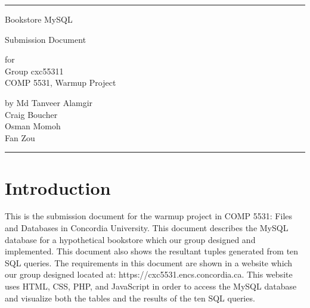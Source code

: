 \documentclass{scrreprt}
\date{}
\begin{document}
\begin{titlepage}
  \flushright\bfseries\huge
    \rule{\linewidth}{5pt}
    \par
    \vspace{1cm}
    {\Huge Bookstore MySQL \par Submission Document\par}
    \vspace{2cm}
    for \\
    \vspace{2cm}
    Group cxc55311 \\
    COMP 5531, Warmup Project \\
    \vspace{2cm}

    by Md Tanveer Alamgir \\
     Craig Boucher\\
     Osman Momoh\\
     Fan Zou\\
    \vspace{2cm}
    \rule{\linewidth}{5pt}
\end{titlepage}
\tableofcontents
\chapter{Introduction}
This is the submission document for the warmup project in COMP 5531: Files and Databases in Concordia University. This document describes the MySQL database for a hypothetical bookstore which our group designed and implemented. This document also shows the resultant tuples generated from ten SQL queries. The requirements in this document are shown in a website which our group designed located at: https://cxc5531.encs.concordia.ca. This website uses HTML, CSS, PHP, and JavaScript in order to access the MySQL database and visualize both the tables and the results of the ten SQL queries.
\end{document}
